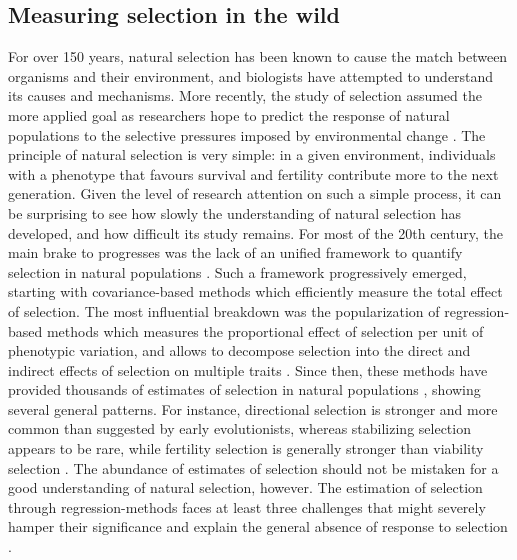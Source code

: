 \subsection{Measuring selection in the wild}
For over 150 years, natural selection has been known to cause the match between organisms and their environment, and biologists have attempted to understand its causes and mechanisms. More recently, the study of selection assumed the more applied goal as researchers hope to predict the response of natural populations to the selective pressures imposed by environmental change \parencite{Chevin2010a, Charmantier2014climate}.
The principle of natural selection is very simple: in a given environment, individuals with a phenotype that favours survival and fertility contribute more to the next generation. Given the level of research attention on such a simple process, it can be surprising to see how slowly the understanding of natural selection has developed, and how difficult its study remains. 
For most of the 20th century, the main brake to progresses was the lack of an unified framework to quantify selection in natural populations \parencite{Wade2006}. Such a framework progressively emerged, starting with covariance-based methods \parencite{Robertson1966, Price1970} which efficiently measure the total effect of selection. The most influential breakdown was the popularization of regression-based methods \parencite{Lande1979,Lande1983} which measures the proportional effect of selection per unit of phenotypic variation, and allows to decompose selection into the direct and indirect effects of selection on multiple traits \parencite{Broodie1995}.
Since then, these methods have provided thousands of estimates of selection in natural populations \parencite{Kingsolver2001,Stinchcombe2008,Kingsolver2012}, showing several general patterns. For instance, directional selection is stronger and more common than suggested by early evolutionists, whereas stabilizing selection appears to be rare, while fertility selection is generally stronger than viability selection \parencite{Kingsolver2012}.
The abundance of estimates of selection should not be mistaken for a good understanding of natural selection, however. The estimation of selection through regression-methods faces at least three challenges that might severely hamper their significance and explain the general absence of response to selection \parencite{Merila2001, Brookfield2016}.

